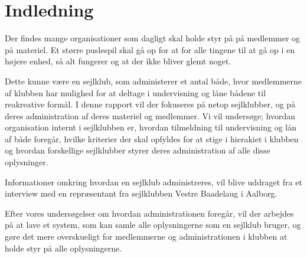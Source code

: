 \chapter{Indledning}\label{chap:indledning}

\cbstart

Der findes mange organisationer som dagligt skal holde styr på på medlemmer og på materiel. Et større
puslespil skal gå op for at for alle tingene til at gå op i en højere enhed, så alt fungerer og at der ikke
bliver glemt noget.

Dette kunne være en sejlklub, som administerer et antal både, hvor medlemmerne af klubben har mulighed for at
deltage i undervisning og låne bådene til reakreative formål. I denne rapport vil der fokuseres på netop
sejlklubber, og på deres administration af deres materiel og medlemmer. Vi vil undersøge; hvordan organisation
internt i sejlklubben er, hvordan tilmeldning til undervisning og lån af både foregår, hvilke kriterier der
skal opfyldes for at stige i hierakiet i klubben og hvordan forskellige sejlklubber styrer deres
administration af alle disse oplysninger.

Informationer omkring hvordan en sejlklub administreres, vil blive uddraget fra et interview med en
repræsentant fra sejlklubben Vestre Baadelaug i Aalborg.

Efter vores undersøgelser om hvordan administrationen foregår, vil der arbejdes på at lave et system, som kan
samle alle oplysningerne som en sejlklub bruger, og gøre det mere overskueligt for medlemmerne og
administrationen i klubben at holde styr på alle oplysningerne.

\cbend
